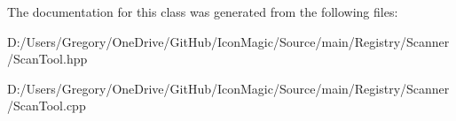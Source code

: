 The documentation for this class was generated from the following files\+:\begin{DoxyCompactItemize}
\item 
D\+:/\+Users/\+Gregory/\+One\+Drive/\+Git\+Hub/\+Icon\+Magic/\+Source/main/\+Registry/\+Scanner/Scan\+Tool.\+hpp\item 
D\+:/\+Users/\+Gregory/\+One\+Drive/\+Git\+Hub/\+Icon\+Magic/\+Source/main/\+Registry/\+Scanner/Scan\+Tool.\+cpp\end{DoxyCompactItemize}

